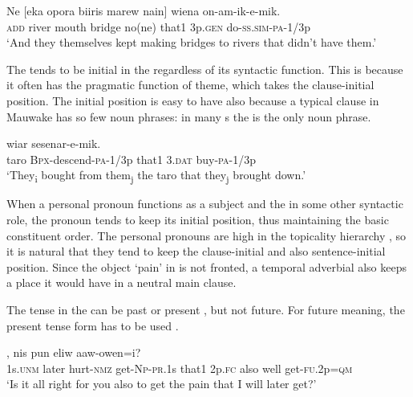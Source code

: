 \ea%
\label{ex:8:x1943}
\gll Ne  [eka  opora  biiris  marew  nain]  wiena on-am-ik-e-mik.\\
\textsc{add} river  mouth  bridge  no(ne)  that1  3p.\textsc{gen} do-\textsc{ss}.\textsc{sim}-\textsc{pa}-1/3p\\
\glt`And they themselves kept making bridges to rivers that didn't have them.'
\z


The  tends to be initial in the  regardless of its syntactic function. This is because it often has the pragmatic function of theme, which takes the clause-initial position. The initial position is easy to have also because a typical clause in Mauwake has so few noun phrases: in many s the  is the only noun phrase. 

\ea%
\label{ex:8:x1552}
  wiar  sesenar-e-mik.\\
taro  \textsc{Bpx}-descend-\textsc{pa}-1/3p  that1  3.\textsc{dat} buy-\textsc{pa}-1/3p \\
\glt`They\textsubscript{i} bought from them\textsubscript{j} the taro that they\textsubscript{j} brought down.'
\z


When a personal pronoun functions as a subject and the  in some other syntactic role, the pronoun tends to keep its initial position, thus maintaining the basic constituent order. The personal pronouns are high in the topicality hierarchy \citep[166]{Givon1976}, so it is natural that they tend to keep the clause-initial and also sentence-initial position.  Since the object  `pain' in  is not fronted, a temporal adverbial also keeps a place it would have in a neutral main clause. 

The tense in the  can be past  or present , but not future. For future meaning, the present tense form has to be used . 

\ea%
\label{ex:8:x1531}
,  nis  pun  eliw aaw-owen=i?\\
1s.\textsc{unm} later  hurt-\textsc{nmz} get-\textsc{Np}-\textsc{pr}.1s  that1  2p.\textsc{fc} also  well get-\textsc{fu}.2p=\textsc{qm}\\
\glt`Is it all right for you also to get the pain that I will later get?'
\z


